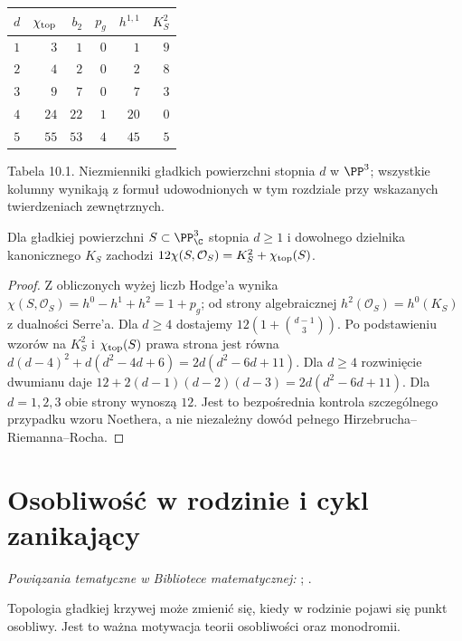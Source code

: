 \begin{center}
\small
\begin{tabular}{c|r|r|r|r|r}
$d$ & $\chi_{\rm top}$ & $b_2$ & $p_g$ & $h^{1,1}$ & $K_S^2$\\\hline
$1$ & $3$ & $1$ & $0$ & $1$ & $9$\\
$2$ & $4$ & $2$ & $0$ & $2$ & $8$\\
$3$ & $9$ & $7$ & $0$ & $7$ & $3$\\
$4$ & $24$ & $22$ & $1$ & $20$ & $0$\\
$5$ & $55$ & $53$ & $4$ & $45$ & $5$
\end{tabular}

\smallskip
{\small Tabela 10.1. Niezmienniki gładkich powierzchni
stopnia $d$ w $\PP^3$; wszystkie kolumny wynikają
z formuł udowodnionych w tym rozdziale przy wskazanych
twierdzeniach zewnętrznych.}\par
\end{center}

\begin{stwierdzenie}
Dla gładkiej powierzchni $S\subset\PP^3_\C$ stopnia $d\ge1$
i dowolnego dzielnika kanonicznego $K_S$ zachodzi
$12\chi(S,\mathcal O_S)=K_S^2+\chi_{\rm top}(S)$.
\end{stwierdzenie}
\begin{proof}
Z obliczonych wyżej liczb Hodge'a wynika
$\chi(S,\mathcal O_S)=h^0-h^1+h^2=1+p_g$;
od strony algebraicznej $h^2(\mathcal O_S)=h^0(K_S)$
z dualności Serre'a. Dla $d\ge4$ dostajemy
$12(1+\binom{d-1}{3})$.
Po podstawieniu wzorów na $K_S^2$ i
$\chi_{\rm top}(S)$ prawa strona jest równa
$d(d-4)^2+d(d^2-4d+6)=2d(d^2-6d+11)$.
Dla $d\ge4$ rozwinięcie dwumianu daje
$12+2(d-1)(d-2)(d-3)=2d(d^2-6d+11)$.
Dla $d=1,2,3$ obie strony wynoszą $12$.
Jest to bezpośrednia kontrola szczególnego przypadku
wzoru Noethera, a nie niezależny dowód pełnego
Hirzebrucha--Riemanna--Rocha.
\end{proof}

\section{Osobliwość w rodzinie i cykl zanikający}
\label{sec:ga10-vanishing}

\noindent\emph{Powiązania tematyczne w Bibliotece matematycznej:} ; .


Topologia gładkiej krzywej może zmienić się, kiedy
w rodzinie pojawi się punkt osobliwy. Jest to ważna
motywacja teorii osobliwości oraz monodromii.

